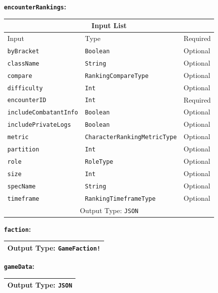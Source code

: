 \documentclass[10pt, a4paper]{memoir}
\numberwithin{equation}{section}
\theoremstyle{plain}
\theoremstyle{defp}
\theoremstyle{dotless}
\theoremstyle{definition}
\theoremstyle{dotless}
\theoremstyle{dotless}
\theoremstyle{defp}
\theoremstyle{defp}
\theoremstyle{be}          %
\theoremstyle{defp}
\newcommand\ttt[1]{\texttt{#1}}
\begin{document}
\medskip

\newpage

\textbf{\ttt{encounterRankings}:}

\begin{table}[h!]
	\centering
	\begin{tabular}{ |p{4.2cm}|p{6cm}|p{3cm}|  }
		\hline
		\multicolumn{3}{|c|}{Input List} \\
		\hline
		Input & Type & Required\\
		\hline
		\ttt{byBracket}   & \ttt{Boolean} & Optional\\
		\ttt{className}& \ttt{String} & Optional\\
		\ttt{compare} & \ttt{RankingCompareType} & Optional\\
		\ttt{difficulty} & \ttt{Int} & Optional\\
		\ttt{encounterID} & \ttt{Int} & Required\\
		\ttt{includeCombatantInfo} & \ttt{Boolean} & Optional\\
		\ttt{includePrivateLogs} & \ttt{Boolean} & Optional\\
		\ttt{metric} & \ttt{CharacterRankingMetricType} & Optional\\
		\ttt{partition} & \ttt{Int} & Optional\\
		\ttt{role} & \ttt{RoleType} & Optional\\
		\ttt{size} & \ttt{Int} & Optional\\
		\ttt{specName} & \ttt{String} & Optional\\
		\ttt{timeframe} & \ttt{RankingTimeframeType} & Optional\\
		\hline
		\multicolumn{3}{|c|}{Output Type: \ttt{JSON}} \\
		\hline
	\end{tabular}
\end{table}

\medskip

\textbf{\ttt{faction}:}

\begin{table}[h]
	\centering
	\begin{tabular}{ |p{3cm}|p{3cm}|p{3cm}|  }
		\hline
		\multicolumn{3}{|c|}{Output Type: \ttt{GameFaction!}} \\
		\hline
	\end{tabular}
\end{table}

\medskip

\textbf{\ttt{gameData}:}

\begin{table}[h]
	\centering
	\begin{tabular}{ |p{3cm}|p{3cm}|p{3cm}|  }
		\hline
		\multicolumn{3}{|c|}{Output Type: \ttt{JSON}} \\
		\hline
	\end{tabular}
\end{table}
\end{document}
